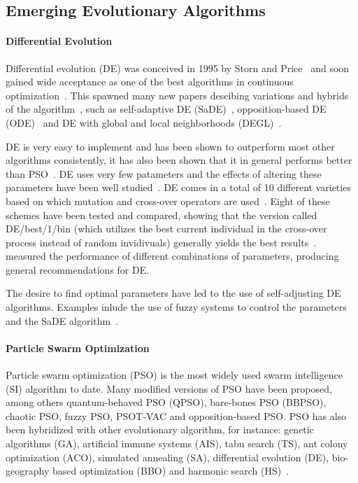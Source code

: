 \subsection{Emerging Evolutionary Algorithms}

\paragraph{Differential Evolution}

Differential evolution (DE) was conceived in 1995 by Storn and Price~\cite{storn1995differential} and soon gained wide acceptance as one of the best algorithms in continuous optimization~\cite{price1997differential}. This spawned many new papers descibing variations and hybrids of the algorithm~\cite{5601760}, such as self-adaptive DE (SaDE)~\cite{qin2009differential}, opposition-based DE (ODE)~\cite{rahnamayan2008opposition} and DE with global and local neighborhoods (DEGL)~\cite{rahnamayan2008opposition}.

DE is very easy to implement and has been shown to outperform most other algorithms consistently, it has also been shown that it in general performs better than PSO~\cite{das2009differential, vesterstrom2004comparative}. DE uses very few patameters and the effects of altering these parameters have been well studied~\cite{5601760}. DE comes in a total of 10 different varieties based on which mutation and cross-over operators are used~\cite{price2006differential}. Eight of these schemes have been tested and compared, showing that the version called DE/best/1/bin (which utilizes the best current individual in the cross-over process instead of random invidivuals) generally yields the best results~\cite{mezura2006comparative}.~\cite{gamperle2002parameter} measured the performance of different combinations of parameters, producing general recommendations for DE.

The desire to find optimal parameters have led to the use of self-adjusting DE algorithms. Examples inlude the use of fuzzy systems to control the parameters~\cite{liu2005fuzzy} and the SaDE algorithm~\cite{qin2009differential}.

\paragraph{Particle Swarm Optimization}

Particle swarm optimization (PSO) is the most widely used swarm intelligence (SI) algorithm to date. Many modified versions of PSO have been proposed, among others quantum-behaved PSO (QPSO), bare-bones PSO (BBPSO), chaotic PSO, fuzzy PSO, PSOT-VAC and opposition-based PSO. PSO has also been hybridized with other evolutionary algorithm, for instance: genetic algorithms (GA), artificial immune systems (AIS), tabu search (TS), ant colony optimization (ACO), simulated annealing (SA), differential evolution (DE), bio-geography based optimization (BBO) and harmonic search (HS)~\cite{zhang2015comprehensive}.

